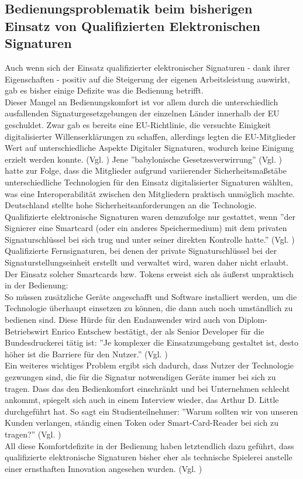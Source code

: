 \documentclass[deutsch]{lib/llncs/llncs}
\begin{document}
\subsection{Bedienungsproblematik beim bisherigen Einsatz von Qualifizierten Elektronischen Signaturen}
Auch wenn sich der Einsatz qualifizierter elektronischer Signaturen - dank ihrer Eigenschaften - positiv auf die Steigerung der eigenen Arbeitsleistung auswirkt, gab es bisher einige Defizite was die Bedienung betrifft. \\
Dieser Mangel an Bedienungskomfort ist vor allem durch die unterschiedlich ausfallenden Signaturgesetzgebungen der einzelnen Länder innerhalb der EU geschuldet. Zwar gab es bereits eine EU-Richtlinie, die versuchte Einigkeit digitalisierter Willenserklärungen zu schaffen, allerdings legten die EU-Mitglieder Wert auf unterschiedliche Aspekte Digitaler Signaturen, wodurch keine Einigung erzielt werden konnte. (Vgl. \cite[S. 30]{Zitat08}) Jene ''babylonische Gesetzesverwirrung'' (Vgl. \cite[S. 30]{Zitat08}) hatte zur Folge, dass die Mitglieder aufgrund variierender Sicherheitsmaßstäbe unterschiedliche Technologien für den Einsatz digitalisierter Signaturen wählten, was eine Interoperabilität zwischen den Mitgliedern praktisch unmöglich machte. \\
Deutschland stellte hohe Sicherheitsanforderungen an die Technologie. Qualifizierte elektronische Signaturen waren demzufolge nur gestattet, wenn ''der Signierer eine Smartcard (oder ein anderes Speichermedium) mit dem privaten Signaturschlüssel bei sich trug und unter seiner direkten Kontrolle hatte.'' (Vgl. \cite[S. 30]{Zitat08}) Qualifizierte Fernsignaturen, bei denen der private Signaturschlüssel bei der Signaturstellungseinheit erstellt und verwaltet wird, waren daher nicht erlaubt. \\
Der Einsatz solcher Smartcards bzw. Tokens erweist sich als äußerst unpraktisch in der Bedienung: \\
So müssen zusätzliche Geräte angeschafft und Software installiert werden, um die Technologie überhaupt einsetzen zu können, die dann auch noch umständlich zu bedienen sind. Diese Hürde für den Endanwender wird auch von Diplom-Betriebswirt Enrico Entschew bestätigt, der als Senior Developer für die Bundesdruckerei tätig ist: ''Je komplexer die Einsatzumgebung gestaltet ist, desto höher ist die Barriere für den Nutzer.'' (Vgl. \cite[S. 232]{Zitat09}) \\
Ein weiteres wichtiges Problem ergibt sich dadurch, dass Nutzer der Technologie gezwungen sind, die für die Signatur notwendigen Geräte immer bei sich zu tragen. Dass das den Bedienkomfort einschränkt und bei Unternehmen schlecht ankommt, spiegelt sich auch in einem Interview wieder, das Arthur D. Little durchgeführt hat. So sagt ein Studienteilnehmer: ''Warum sollten wir von unseren Kunden verlangen, ständig einen Token oder Smart-Card-Reader bei sich zu tragen?'' (Vgl. \cite[S. 5]{Zitat05}) \\
All diese Komfortdefizite in der Bedienung haben letztendlich dazu geführt, dass qualifizierte elektronische Signaturen bisher eher als technische Spielerei anstelle einer ernsthaften Innovation angesehen wurden.  (Vgl. \cite[S. 29]{Zitat08})
\end{document}
